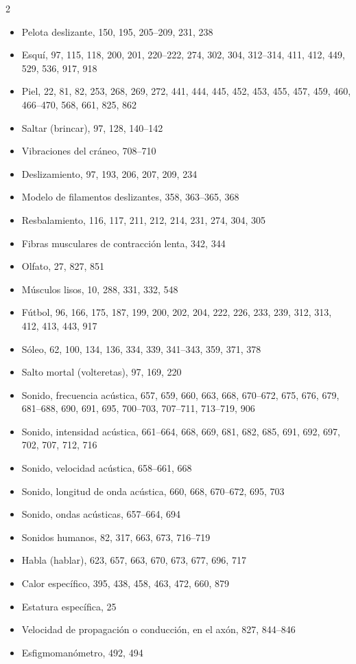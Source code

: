 \documentclass[12pt,a4paper]{book}
\begin{document}
\begin{multicols}{2}
\begin{itemize}[leftmargin=*]
  \item Pelota deslizante, 150, 195, 205--209, 231, 238
  \item Esquí, 97, 115, 118, 200, 201, 220--222, 274, 302, 304, 312--314, 411, 412, 449, 529, 536, 917, 918
  \item Piel, 22, 81, 82, 253, 268, 269, 272, 441, 444, 445, 452, 453, 455, 457, 459, 460, 466--470, 568, 661, 825, 862
  \item Saltar (brincar), 97, 128, 140--142
  \item Vibraciones del cráneo, 708--710
  \item Deslizamiento, 97, 193, 206, 207, 209, 234
  \item Modelo de filamentos deslizantes, 358, 363--365, 368
  \item Resbalamiento, 116, 117, 211, 212, 214, 231, 274, 304, 305
  \item Fibras musculares de contracción lenta, 342, 344
  \item Olfato, 27, 827, 851
  \item Músculos lisos, 10, 288, 331, 332, 548
  \item Fútbol, 96, 166, 175, 187, 199, 200, 202, 204, 222, 226, 233, 239, 312, 313, 412, 413, 443, 917
  \item Sóleo, 62, 100, 134, 136, 334, 339, 341--343, 359, 371, 378
  \item Salto mortal (volteretas), 97, 169, 220
  \item Sonido, frecuencia acústica, 657, 659, 660, 663, 668, 670--672, 675, 676, 679, 681--688, 690, 691, 695, 700--703, 707--711, 713--719, 906
  \item Sonido, intensidad acústica, 661--664, 668, 669, 681, 682, 685, 691, 692, 697, 702, 707, 712, 716
  \item Sonido, velocidad acústica, 658--661, 668
  \item Sonido, longitud de onda acústica, 660, 668, 670--672, 695, 703
  \item Sonido, ondas acústicas, 657--664, 694
  \item Sonidos humanos, 82, 317, 663, 673, 716--719
  \item Habla (hablar), 623, 657, 663, 670, 673, 677, 696, 717
  \item Calor específico, 395, 438, 458, 463, 472, 660, 879
  \item Estatura específica, 25
  \item Velocidad de propagación o conducción, en el axón, 827, 844--846
  \item Esfigmomanómetro, 492, 494

\end{itemize}
\end{multicols}
\end{document}
